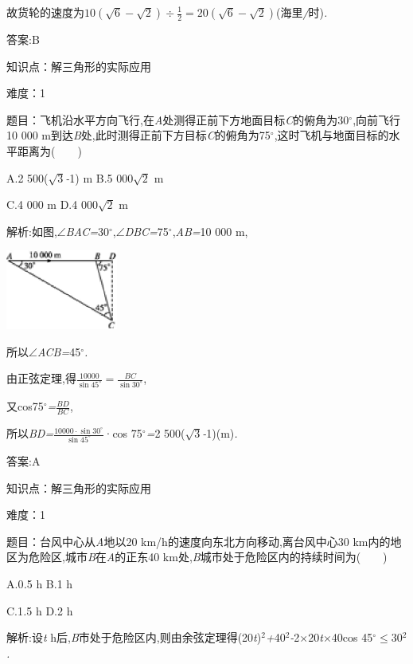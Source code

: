 \documentclass{article} %
\begin{document}
故货轮的速度为$10(\sqrt{6}-\sqrt{2})\div \frac{1}{2}=20(\sqrt{6}-\sqrt{2})$(海里\textit{/}时)\textit{.}

 答案:B

知识点：解三角形的实际应用

难度：1

 题目：飞机沿水平方向飞行,在\textit{A}处测得正前下方地面目标\textit{C}的俯角为30$\mathrm{{}^\circ}$,向前飞行10 000 m到达\textit{B}处,此时测得正前下方目标\textit{C}的俯角为75$\mathrm{{}^\circ}$,这时飞机与地面目标的水平距离为(\textit{　　})

 A.2 500($\sqrt{3}$\textit{-}1) m B.5 000$\sqrt{2}$ m

 C.4 000 m D.4 000$\sqrt{2}$ m

 解析:如图,$\mathrm{\angle}$\textit{BAC=}30$\mathrm{{}^\circ}$,$\mathrm{\angle}$\textit{DBC=}75$\mathrm{{}^\circ}$,\textit{AB=}10 000 m,

 \includegraphics*[width=1.45in, height=1.03in, keepaspectratio=false]{image1096}

所以$\mathrm{\angle}$\textit{ACB=}45$\mathrm{{}^\circ}$\textit{.}

由正弦定理,得$\frac{10000}{\sin 45^{\circ}}=\frac{BC}{\sin 30^{\circ}}$,

又cos75$\mathrm{{}^\circ}$\textit{=}$\frac{BD}{BC}$,

所以\textit{BD=}$\frac{10000\cdot\sin 30^{\circ}}{\sin 45^{\circ}}$·cos 75$\mathrm{{}^\circ}$\textit{=}2 500($\sqrt{3}$\textit{-}1)(m)\textit{.}

 答案:A

知识点：解三角形的实际应用

难度：1

 题目：台风中心从\textit{A}地以20 km/h的速度向东北方向移动,离台风中心30 km内的地区为危险区,城市\textit{B}在\textit{A}的正东40 km处,\textit{B}城市处于危险区内的持续时间为(\textit{　　})

 A.0\textit{.}5 h B.1 h 

 C.1\textit{.}5 h D.2 h

 解析:设\textit{t} h后,\textit{B}市处于危险区内,则由余弦定理得(20\textit{t})${}^{2}$\textit{+}40${}^{2}$\textit{-}2\textit{$\times$}20\textit{t$\times$}40cos 45$\mathrm{{}^\circ}$$\mathrm{\le}$30${}^{2}$\textit{.}
\end{document}
